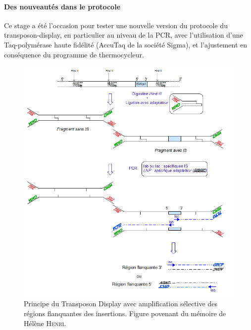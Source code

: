 	\paragraph{Des nouveautés dans le protocole} %
	\label{par:protocole2}
	Ce stage a été l’occasion pour tester une nouvelle version du protocole du transposon-display, en particulier au niveau de la PCR, avec l’utilisation d’une Taq-polymérase haute fidélité (AccuTaq de la société Sigma), et l’ajustement en conséquence du programme de thermocycleur.

\begin{figure}[h!]
	\begin{center}
		\includegraphics[width=160mm]{tdisplay.png}
	\end{center}
	\caption{Principe du Transposon Display avec amplification sélective des régions
flanquantes des insertions. Figure povenant du mémoire de Hélène \textsc{Henri}\cite{memHH}.%
	}
	\label{fig:figure1}
\end{figure}

